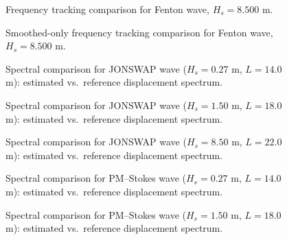 \documentclass[11pt,letterpaper]{article}
\begin{document}
\begin{figure}[H]\centering
  \resizebox{\textwidth}{!}{}
  \caption{Frequency tracking comparison for Fenton wave, $H_s = 8.500$ m.}
  \label{fig:freqtrack_fenton_high}
\end{figure}
\begin{figure}[H]\centering
  \resizebox{\textwidth}{!}{}
  \caption{Smoothed-only frequency tracking comparison for Fenton wave, $H_s = 8.500$ m.}
  \label{fig:freqtrack_fenton_high_smooth}
\end{figure}


\begin{figure}[H]\centering
  \resizebox{\textwidth}{!}{}
  \caption{Spectral comparison for JONSWAP wave ($H_s = 0.27$ m, $L = 14.0$ m):
  estimated vs.\ reference displacement spectrum.}
  \label{fig:regspec_jonswap_low}
\end{figure}

\begin{figure}[H]\centering
  \resizebox{\textwidth}{!}{}
  \caption{Spectral comparison for JONSWAP wave ($H_s = 1.50$ m, $L = 18.0$ m):
  estimated vs.\ reference displacement spectrum.}
  \label{fig:regspec_jonswap_medium}
\end{figure}

\begin{figure}[H]\centering
  \resizebox{\textwidth}{!}{}
  \caption{Spectral comparison for JONSWAP wave ($H_s = 8.50$ m, $L = 22.0$ m):
  estimated vs.\ reference displacement spectrum.}
  \label{fig:regspec_jonswap_high}
\end{figure}

\begin{figure}[H]\centering
  \resizebox{\textwidth}{!}{}
  \caption{Spectral comparison for PM–Stokes wave ($H_s = 0.27$ m, $L = 14.0$ m):
  estimated vs.\ reference displacement spectrum.}
  \label{fig:regspec_pmstokes_low}
\end{figure}

\begin{figure}[H]\centering
  \resizebox{\textwidth}{!}{}
  \caption{Spectral comparison for PM–Stokes wave ($H_s = 1.50$ m, $L = 18.0$ m):
  estimated vs.\ reference displacement spectrum.}
  \label{fig:regspec_pmstokes_medium}
\end{figure}
\end{document}
